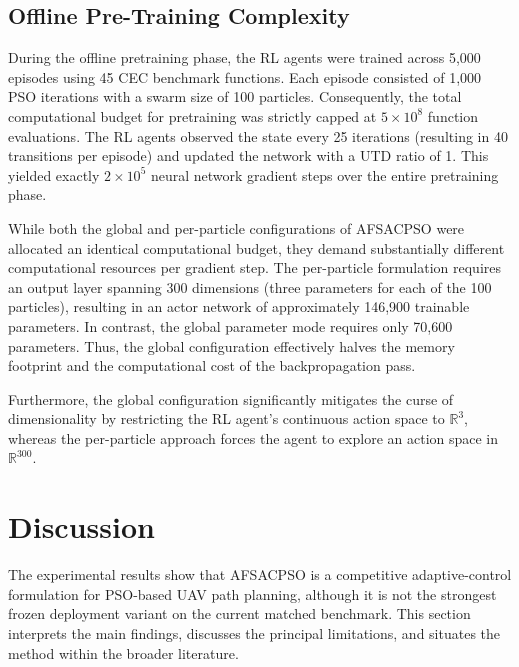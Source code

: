 \documentclass[final,5p,times]{elsarticle}
\begin{document}
\subsection{Offline Pre-Training Complexity}
During the offline pretraining phase, the RL agents were trained across 5,000 episodes using 45 CEC benchmark functions. Each episode consisted of 1,000 PSO iterations with a swarm size of 100 particles. Consequently, the total computational budget for pretraining was strictly capped at $5 \times 10^8$ function evaluations. The RL agents observed the state every 25 iterations (resulting in 40 transitions per episode) and updated the network with a UTD ratio of 1. This yielded exactly $2 \times 10^5$ neural network gradient steps over the entire pretraining phase.

While both the global and per-particle configurations of AFSACPSO were allocated an identical computational budget, they demand substantially different computational resources per gradient step. The per-particle formulation requires an output layer spanning 300 dimensions (three parameters for each of the 100 particles), resulting in an actor network of approximately 146,900 trainable parameters. In contrast, the global parameter mode requires only 70,600 parameters. Thus, the global configuration effectively halves the memory footprint and the computational cost of the backpropagation pass. 

Furthermore, the global configuration significantly mitigates the curse of dimensionality by restricting the RL agent's continuous action space to $\mathbb{R}^3$, whereas the per-particle approach forces the agent to explore an action space in $\mathbb{R}^{300}$.



\section{Discussion}
\label{sec:discussion}
The experimental results show that AFSACPSO is a competitive adaptive-control formulation for PSO-based UAV path planning, although it is not the strongest frozen deployment variant on the current matched benchmark.
This section interprets the main findings, discusses the principal limitations, and situates the method within the broader literature.
\end{document}
